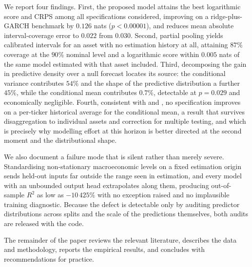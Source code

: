 We report four findings. First, the proposed model attains the best logarithmic
score and CRPS among all specifications considered, improving on a
ridge-plus-GARCH benchmark by $0.126$ nats ($p<0.00001$), and reduces mean
absolute interval-coverage error to $0.022$ from $0.030$. Second, partial pooling
yields calibrated intervals for an asset with no estimation history at all,
attaining $87\%$ coverage at the $90\%$ nominal level and a logarithmic score
within $0.005$ nats of the same model estimated with that asset included. Third,
decomposing the gain in predictive density over a null forecast locates its
source: the conditional variance contributes $54\%$ and the shape of the
predictive distribution a further $45\%$, while the conditional mean contributes
$0.7\%$, detectable at $p=0.029$ and economically negligible. Fourth,
consistent with \citet{welch2008comprehensive} and \citet{timmermann2008elusive},
no specification improves on a per-ticker historical average for the conditional
mean, a result that survives disaggregation to individual assets and correction
for multiple testing, and which is precisely why modelling effort at this horizon
is better directed at the second moment and the distributional shape.

We also document a failure mode that is silent rather than merely severe.
Standardising non-stationary macroeconomic levels on a fixed estimation origin
sends held-out inputs far outside the range seen in estimation, and every model
with an unbounded output head extrapolates along them, producing out-of-sample
$R^2$ as low as $-10\,425\%$ with no exception raised and no implausible training
diagnostic. Because the defect is detectable only by auditing predictor
distributions across splits and the scale of the predictions themselves, both
audits are released with the code.

The remainder of the paper reviews the relevant literature, describes the data
and methodology, reports the empirical results, and concludes with
recommendations for practice.
